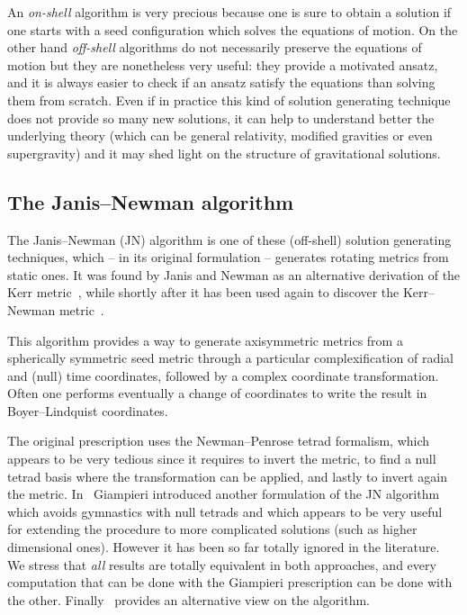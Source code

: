 An \emph{on-shell} algorithm is very precious because one is sure to obtain a solution if one starts with a seed configuration which solves the equations of motion.
On the other hand \emph{off-shell} algorithms do not necessarily preserve the equations of motion but they are nonetheless very useful: they provide a motivated ansatz, and it is always easier to check if an ansatz satisfy the equations than solving them from scratch.
Even if in practice this kind of solution generating technique does not provide so many new solutions, it can help to understand better the underlying theory (which can be general relativity, modified gravities or even supergravity) and it may shed light on the structure of gravitational solutions.


\subsection{The Janis--Newman algorithm}


The Janis--Newman (JN) algorithm is one of these (off-shell) solution generating techniques, which -- in its original formulation -- generates rotating metrics from static ones.
It was found by Janis and Newman as an alternative derivation of the Kerr metric~\cite{Newman:1965:NoteKerrSpinningParticle}, while shortly after it has been used again to discover the Kerr--Newman metric~\cite{Newman:1965:MetricRotatingCharged}.

This algorithm provides a way to generate axisymmetric metrics from a spherically symmetric seed metric through a particular complexification of radial and (null) time coordinates, followed by a complex coordinate transformation.
Often one performs eventually a change of coordinates to write the result in Boyer--Lindquist coordinates.

The original prescription uses the Newman--Penrose tetrad formalism, which appears to be very tedious since it requires to invert the metric, to find a null tetrad basis where the transformation can be applied, and lastly to invert again the metric.
In~\cite{Giampieri:1990:IntroducingAngularMomentum} Giampieri introduced another formulation of the JN algorithm which avoids gymnastics with null tetrads and which appears to be very useful for extending the procedure to more complicated solutions (such as higher dimensional ones).
However it has been so far totally ignored in the literature.
We stress that \emph{all} results are totally equivalent in both approaches, and every computation that can be done with the Giampieri prescription can be done with the other.
Finally~\cite{Nawarajan:2016:CartesianKerrSchildVariation} provides an alternative view on the algorithm.

